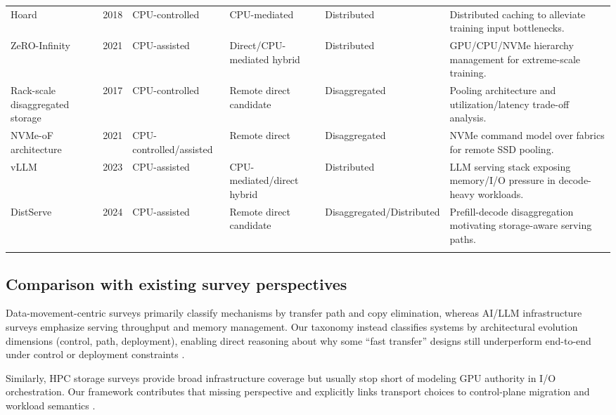 \begin{table}[t]
\begin{tabular}{@{}p{2.6cm}p{0.9cm}p{2.1cm}p{2.2cm}p{2.0cm}p{5.5cm}@{}}
Hoard \cite{hoard2018} & 2018 & CPU-controlled & CPU-mediated & Distributed & Distributed caching to alleviate training input bottlenecks. \\
ZeRO-Infinity \cite{rajbhandari2021zeroinfinity} & 2021 & CPU-assisted & Direct/CPU-mediated hybrid & Distributed & GPU/CPU/NVMe hierarchy management for extreme-scale training. \\
Rack-scale disaggregated storage \cite{liu2017rackscale} & 2017 & CPU-controlled & Remote direct candidate & Disaggregated & Pooling architecture and utilization/latency trade-off analysis. \\
NVMe-oF architecture \cite{nvmeof_spec} & 2021 & CPU-controlled/assisted & Remote direct & Disaggregated & NVMe command model over fabrics for remote SSD pooling. \\
vLLM \cite{kwon2023vllm} & 2023 & CPU-assisted & CPU-mediated/direct hybrid & Distributed & LLM serving stack exposing memory/I/O pressure in decode-heavy workloads. \\
DistServe \cite{zhong2024distserve} & 2024 & CPU-assisted & Remote direct candidate & Disaggregated/Distributed & Prefill-decode disaggregation motivating storage-aware serving paths. \\
\botrule
\end{tabular}
\end{table}

\subsection{Comparison with existing survey perspectives}

Data-movement-centric surveys primarily classify mechanisms by transfer path and copy elimination, whereas AI/LLM infrastructure surveys emphasize serving throughput and memory management. Our taxonomy instead classifies systems by architectural evolution dimensions (control, path, deployment), enabling direct reasoning about why some ``fast transfer'' designs still underperform end-to-end under control or deployment constraints \cite{traub2023compstoragesurvey,murray2021tfdata,kwon2023vllm}.

Similarly, HPC storage surveys provide broad infrastructure coverage but usually stop short of modeling GPU authority in I/O orchestration. Our framework contributes that missing perspective and explicitly links transport choices to control-plane migration and workload semantics \cite{zhang2025hpcstoragesurvey,qureshi2023bam,geminifs2025}.

